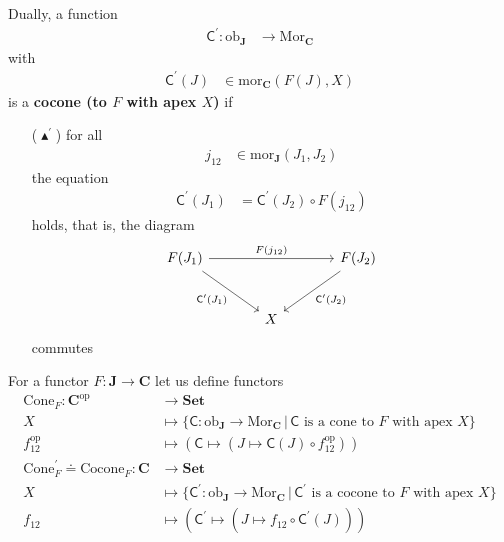 Dually, a function
\begin{align*}
  \mathsf{C}^{\prime}
  \colon
  \mathrm{ob}_{\mathbf{J}}
  &\rightarrow
  \mathrm{Mor}_{\mathbf{C}}
\end{align*}
with
\begin{align*}
  \mathsf{C}^{\prime}(J)
  &\in
  \mathrm{mor}_{\mathbf{C}}(F(J),X)
\end{align*}
is a \textbf{cocone (to $F$ with apex $X$)} if
\begin{enumerate}
\item[($\blacktriangle^{\prime}$)]
for all
\begin{align*}
  j_{12}
  &\in
  \mathrm{mor}_{\mathbf{J}}(J_{1},J_{2})
\end{align*}
the equation
\begin{align*}
  \mathsf{C}^{\prime}(J_{1})
  &=
  \mathsf{C}^{\prime}(J_{2})
  \circ
  F(j_{12})
\end{align*}
holds, that is, the diagram
\[
\begin{tikzcd}[sep=large]
  F(J_{1})
  \arrow{rr}{F(j_{12})}
  \arrow[swap]{dr}{\mathsf{C}^{\prime}(J_{1})}
  &
  &
  F(J_{2})
  \arrow{dl}{\mathsf{C}^{\prime}(J_{2})}
  \\
  &
  X
  &
\end{tikzcd}
\]
commutes
\end{enumerate}
For a functor $F \colon \mathbf{J} \rightarrow \mathbf{C}$ let us define functors
\begin{align*}
  \mathrm{Cone}_{F}
  \colon
  \mathbf{C}^{\mathrm{op}}
  &\rightarrow
  \mathbf{Set}
  \\
  X
  &\mapsto
  \lbrace
      \mathsf{C}
      \colon
      \mathrm{ob}_{\mathbf{J}}
      \rightarrow
      \mathrm{Mor}_{\mathbf{C}}
    \,
    \vert
    \,
      \mathsf{C}
      \text{ is a cone to }
      F
      \text{ with apex }
      X
  \rbrace
  \\
  f_{12}^{\mathrm{op}}
  &\mapsto
  \left(
    \mathsf{C}
    \mapsto
    \left(
      J
      \mapsto
      \mathsf{C}(J)
      \circ
      f_{12}^{\mathrm{op}}
    \right)
  \right)
  \\
  \mathrm{Cone}_{F}^{\prime}
  \doteq
  \mathrm{Cocone}_{F}
  \colon
  \mathbf{C}
  &\rightarrow
  \mathbf{Set}
  \\
  X
  &\mapsto
  \lbrace
      \mathsf{C}^{\prime}
      \colon
      \mathrm{ob}_{\mathbf{J}}
      \rightarrow
      \mathrm{Mor}_{\mathbf{C}}
    \,
    \vert
    \,
      \mathsf{C}^{\prime}
      \text{ is a cocone to }
      F
      \text{ with apex }
      X
  \rbrace
  \\
  f_{12}
  &\mapsto
  \left(
    \mathsf{C}^{\prime}
    \mapsto
    \left(
      J
      \mapsto
      f_{12}
      \circ
      \mathsf{C}^{\prime}(J)
    \right)
  \right)
\end{align*}

